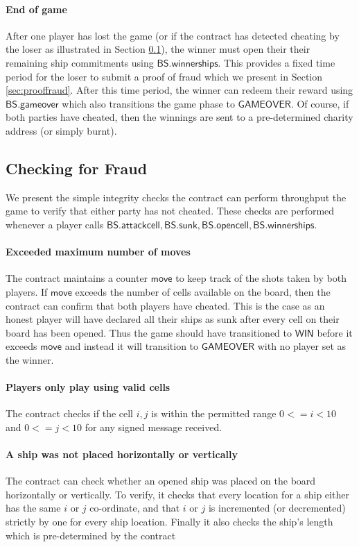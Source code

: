 \documentclass{llncs}
\newcommand{\gamewinner}{\mathsf{WIN}}
\newcommand{\gamefinished}{\mathsf{GAMEOVER}}
\newcommand{\battleshipattackcell}{\mathsf{BS.attackcell}}
\newcommand{\battleshiprevealcell}{\mathsf{BS.opencell}}
\newcommand{\battleshipsinking}{\mathsf{BS.sunk}}
\newcommand{\battleshiprevealships}{\mathsf{BS.winnerships}}
\newcommand{\battleshipgameover}{\mathsf{BS.gameover}}
\begin{document}
\paragraph{End of game} 
After one player has lost the game (or if the contract has detected cheating by the loser as illustrated in Section \ref{sec:fraud}), the winner must open their their remaining ship commitments  using $\battleshiprevealships$.
This provides a fixed time period for the loser to submit a proof of fraud which we present in Section \ref{sec:prooffraud}.
After this time period, the winner can redeem their reward using $\battleshipgameover$ which also transitions the game phase to $\gamefinished$. 
Of course, if both parties have cheated, then the winnings are sent to a pre-determined charity address (or simply burnt). 

\subsection{Checking for Fraud} \label{sec:fraud}

We present the simple integrity checks the contract can perform throughput the game to verify that either party has not cheated. 
These checks are performed whenever a player calls $\battleshipattackcell, \battleshipsinking, \battleshiprevealcell, \battleshiprevealships$.


\paragraph{Exceeded maximum number of moves} 
The contract maintains a counter $\mathsf{move}$ to keep track of the shots taken by both players. 
If $\mathsf{move}$ exceeds the number of cells available on the board, then the contract can confirm that both players have cheated.
This is the case as an honest player will have declared all their ships as sunk after every cell on their board has been opened.
Thus the game should have transitioned to $\gamewinner$ before it exceeds $\mathsf{move}$ and instead it will transition to $\gamefinished$ with no player set as the winner. 

\paragraph{Players only play using valid cells}  
The contract checks if the cell $i,j$ is within the permitted range $0 <= i < 10$ and $0 <= j < 10$ for any signed message received. 

\paragraph{A ship was not placed  horizontally or vertically}
The contract can check whether an opened ship was placed on the board horizontally or vertically. 
To verify, it checks that every location for a ship either has the same $i$ or $j$ co-ordinate, and that $i$ or $j$ is incremented (or decremented) strictly by one for every ship location. 
Finally it also checks the ship's length which is pre-determined by the contract
\end{document}
